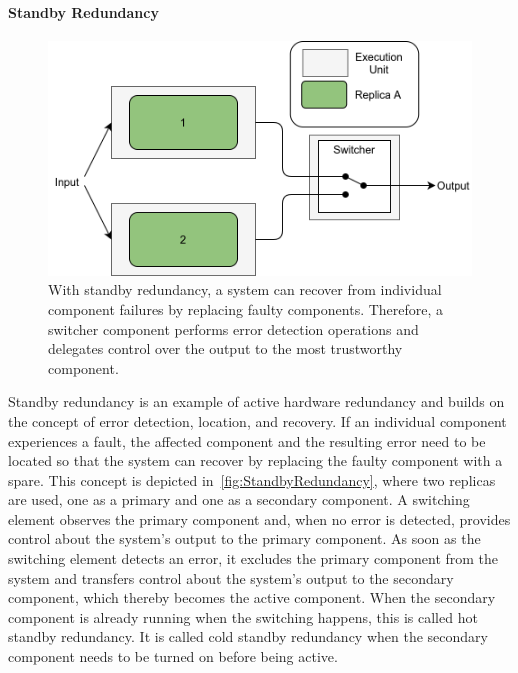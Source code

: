\paragraph{Standby Redundancy}
\begin{figure}[!hb]
	\centering
	\includegraphics[width=0.8\linewidth]{images/ActiveSelectionRedundancy}
	\caption{With standby redundancy, a system can recover from individual component failures by replacing faulty components. Therefore, a switcher component performs error detection operations and delegates control over the output to the most trustworthy component.}
	\label{fig:StandbyRedundancy}
\end{figure}

Standby redundancy is an example of active hardware redundancy and builds on the concept of error detection, location, and recovery.
If an individual component experiences a fault, the affected component and the resulting error need to be located so that the system can recover by replacing the faulty component with a spare.
This concept is depicted in~\autoref{fig:StandbyRedundancy}, where two replicas are used, one as a primary and one as a secondary component.
A switching element observes the primary component and, when no error is detected, provides control about the system's output to the primary component.
As soon as the switching element detects an error, it excludes the primary component from the system and transfers control about the system's output to the secondary component, which thereby becomes the active component.
When the secondary component is already running when the switching happens, this is called hot standby redundancy.
It is called cold standby redundancy when the secondary component needs to be turned on before being active.

